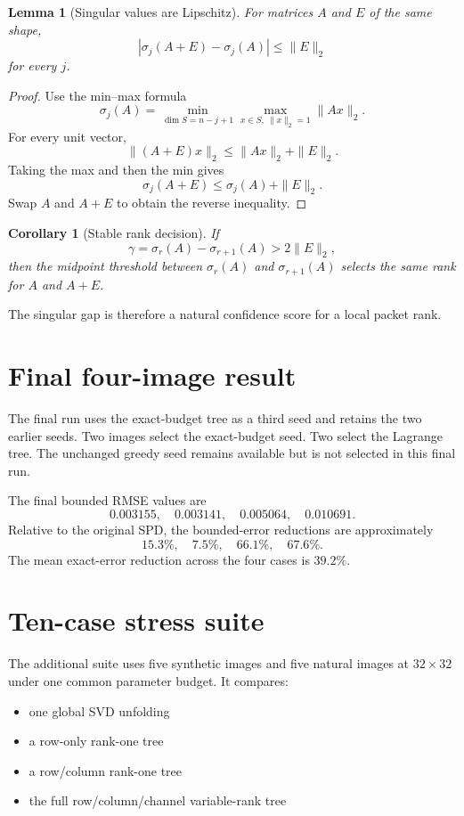 \documentclass[11pt]{article}
\newtheorem{lemma}[theorem]{Lemma}
\newtheorem{corollary}[theorem]{Corollary}
\theoremstyle{definition}
\theoremstyle{remark}
\begin{document}
\begin{lemma}[Singular values are Lipschitz]
For matrices $A$ and $E$ of the same shape,
\[
\boxed{
|\sigma_j(A+E)-\sigma_j(A)|
\le
\|E\|_2
}
\]
for every $j$.
\end{lemma}

\begin{proof}
Use the min--max formula
\[
\sigma_j(A)
=
\min_{\dim S=n-j+1}
\max_{x\in S,\ \|x\|_2=1}
\|Ax\|_2.
\]
For every unit vector,
\[
\|(A+E)x\|_2
\le
\|Ax\|_2+\|E\|_2.
\]
Taking the max and then the min gives
\[
\sigma_j(A+E)\le\sigma_j(A)+\|E\|_2.
\]
Swap $A$ and $A+E$ to obtain the reverse inequality.
\end{proof}

\begin{corollary}[Stable rank decision]
If
\[
\gamma=\sigma_r(A)-\sigma_{r+1}(A)>2\|E\|_2,
\]
then the midpoint threshold between $\sigma_r(A)$ and $\sigma_{r+1}(A)$ selects the same rank for $A$ and $A+E$.
\end{corollary}

The singular gap is therefore a natural confidence score for a local packet rank.

\section{Final four-image result}
The final run uses the exact-budget tree as a third seed and retains the two earlier seeds. Two images select the exact-budget seed. Two select the Lagrange tree. The unchanged greedy seed remains available but is not selected in this final run.



The final bounded RMSE values are
\[
\boxed{
0.003155,\quad
0.003141,\quad
0.005064,\quad
0.010691.
}
\]
Relative to the original SPD, the bounded-error reductions are approximately
\[
15.3\%,\quad7.5\%,\quad66.1\%,\quad67.6\%.
\]
The mean exact-error reduction across the four cases is $39.2\%$.

\section{Ten-case stress suite}
The additional suite uses five synthetic images and five natural images at $32\times32$ under one common parameter budget. It compares:

\begin{itemize}
\item one global SVD unfolding
\item a row-only rank-one tree
\item a row/column rank-one tree
\item the full row/column/channel variable-rank tree
\end{itemize}
\end{document}
